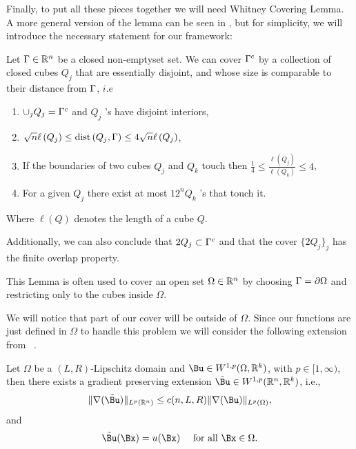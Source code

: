 Finally, to put all these pieces together we will need Whitney Covering Lemma. A more general version of the lemma can be seen in \cite{stein}, but for simplicity, we will introduce the necessary statement for our framework:

\begin{lemma} \label{Whitney}Let $\Gamma\in \mathbb{R}^n$ be a closed non-emptyset set. We can cover $\Gamma^c$ by a collection of closed cubes $Q_j$ that are essentially disjoint, and whose size is comparable to their distance from $\Gamma$, $i.e$
    \begin{enumerate}
    \item $\cup_j Q_j=\Gamma^c$ and  $Q_j$ 's have disjoint interiors,
    \item $\sqrt{n} \ell\left(Q_j\right) \leq \operatorname{dist}\left(Q_j, \Gamma\right) \leq 4 \sqrt{n} \ell\left(Q_j\right)$,
    \item If the boundaries of two cubes $Q_j$ and $Q_k$ touch then $\frac{1}{4} \leq \frac{\ell\left(Q_j\right)}{\ell\left(Q_k\right)} \leq 4$,
    \item For a given $Q_j$ there exist at most $12^n Q_k$ 's that touch it.
    \end{enumerate}
    Where $\ell(Q)$ denotes the length of a cube $Q$.
    
    Additionally, we can also conclude that $2Q_j\subset \Gamma^c$ and that the cover $\{2Q_j\}_j$ has the finite overlap property.
    \end{lemma}
    \begin{remark}
        This Lemma is often used to cover an open set $\Omega\in \mathbb{R}^n$ by choosing $\Gamma=\partial\Omega$ and restricting only to the cubes inside $\Omega$.
    \end{remark}

    We will notice that part of our cover will be outside of $\Omega$. Since our functions are just defined in $\Omega$ to handle this problem we will consider the following extension from ~\cite[Theorem~4.7]{evansGa}. 
    \begin{lemma}\label{GradExt} Let $\Omega$ be a $(L, R)$-Lipschitz domain and $\Bu\in W^{1,p}(\Omega,\mathbb{R}^k)$, with $p\in[1,\infty)$, then there exists a gradient preserving extension $\tilde{\Bu}\in W^{1,p}(\R^n,\R^k)$, i.e.,
    $$\|\nabla(\tilde{\Bu})\|_{L^p(\R^n)}\leq c(n,L,R)\|\nabla(\Bu)\|_{L^p(\Omega)},$$ 
    and
    $$\tilde{\Bu}(\Bx)=u(\Bx) \quad \text { for all } \Bx \in \Omega.$$
    \end{lemma}


